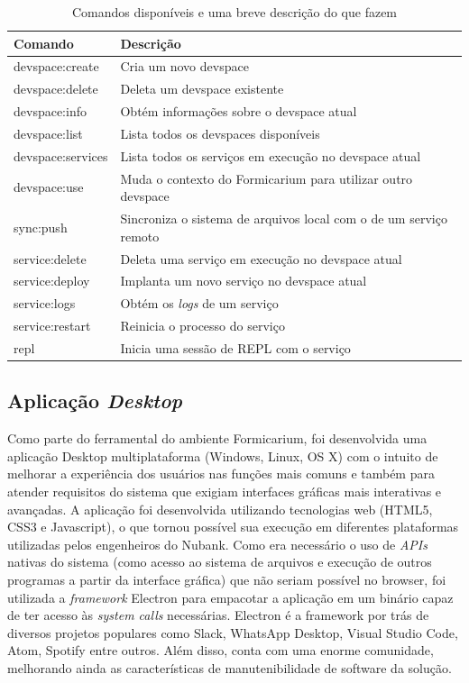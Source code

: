         \begin{table}[ht]
        \centering
        \caption{Comandos disponíveis e uma breve descrição do que fazem}
        \begin{tabular}{l l}
        Comando & Descrição \\
        \hline
          devspace:create    & Cria um novo devspace \\
          devspace:delete    & Deleta um devspace existente \\
          devspace:info      & Obtém informações sobre o devspace atual \\
          devspace:list      & Lista todos os devspaces disponíveis \\
          devspace:services  & Lista todos os serviços em execução no devspace atual \\
          devspace:use       & Muda o contexto do Formicarium para utilizar outro devspace \\
          sync:push          & Sincroniza o sistema de arquivos local com o de um serviço remoto \\
          service:delete     & Deleta uma serviço em execução no devspace atual \\
          service:deploy     & Implanta um novo serviço no devspace atual \\
          service:logs       & Obtém os \textit{logs} de um serviço \\
          service:restart    & Reinicia o processo do serviço \\
          repl               & Inicia uma sessão de REPL com o serviço \\
        \end{tabular}
        \label{tab:commands}
        \end{table}
    
        \subsection{Aplicação \textit{Desktop}}
    
        Como parte do ferramental do ambiente Formicarium, foi desenvolvida uma aplicação Desktop multiplataforma (Windows, Linux, OS X) com o intuito de melhorar a experiência dos usuários nas funções mais comuns e também para atender requisitos do sistema que exigiam interfaces gráficas mais interativas e avançadas. A aplicação foi desenvolvida utilizando tecnologias web (HTML5, CSS3 e Javascript), o que tornou possível sua execução em diferentes plataformas utilizadas pelos engenheiros do Nubank. Como era necessário o uso de \textit{APIs} nativas do sistema (como acesso ao sistema de arquivos e execução de outros programas a partir da interface gráfica) que não seriam possível no browser, foi utilizada a \textit{framework} Electron para empacotar a aplicação em um binário capaz de ter acesso às \textit{system calls} necessárias. Electron é a framework por trás de diversos projetos populares como Slack, WhatsApp Desktop, Visual Studio Code, Atom, Spotify entre outros. Além disso, conta com uma enorme comunidade, melhorando ainda as características de manutenibilidade de software da solução.
    
